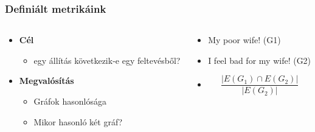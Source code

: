 \documentclass[bigger]{beamer}
\begin{document}
\begin{frame}
\frametitle{Definiált metrikáink}
\begin{columns}
	\begin{column}{0.5\textwidth}
		\begin{itemize}
			\pause \item \textbf{Cél}
			\begin{itemize}
				\item egy állítás következik-e egy feltevésből?
			\end{itemize}
			\pause \item \textbf{Megvalósítás}
			\begin{itemize}
				\item Gráfok hasonlósága
				\item Mikor hasonló két gráf?
			\end{itemize}
		\end{itemize}
	\end{column}
	\begin{column}{0.5\textwidth}
		\begin{itemize}
			\pause \item My poor wife! (G1)
			\pause \item I feel bad for my wife! (G2)
			\pause \item \[\frac{|E(G_1)\cap E(G_2)|}{|E(G_2)|}\]			
		\end{itemize}
	\end{column}
\end{columns}

\end{frame}
\end{document}

